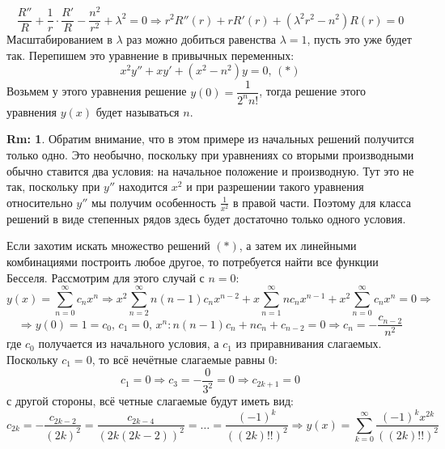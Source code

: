 \documentclass[12pt]{article}
\theoremstyle{definition}
\newtheorem{rem}{Rm:}
\newcommand{\ddsum}[2]{\displaystyle\sum\limits_{#1}^{#2}}
\begin{document}
$$
	\dfrac{R''}{R} + \dfrac{1}{r}{\cdot}\dfrac{R'}{R} - \dfrac{n^2}{r^2} + \lambda^2 = 0 \Rightarrow r^2 R''(r) + r R'(r) + (\lambda^2 r^2  - n^2)R(r) = 0
$$
Масштабированием в $\lambda$ раз можно добиться равенства $\lambda = 1$, пусть это уже будет так. Перепишем это уравнение в привычных переменных:
$$
	x^2 y'' + x y' + (x^2 - n^2)y = 0, \, (*)
$$
Возьмем у этого уравнения решение $y(0) = \dfrac{1}{2^n n!}$, тогда решение этого уравнения $y(x)$ будет называться  $n$.
\begin{rem}
	Обратим внимание, что в этом примере из начальных решений получится только одно. Это необычно, поскольку при уравнениях со вторыми производными обычно ставится два условия: на начальное положение и производную. Тут это не так, поскольку при $y''$ находится $x^2$ и при разрешении такого уравнения относительно $y''$ мы получим особенность $\tfrac{1}{x^2}$ в правой части. Поэтому для класса решений в виде степенных рядов здесь будет достаточно только одного условия. 
\end{rem}

Если захотим искать множество решений $(*)$, а затем их линейными комбинациями построить любое другое, то потребуется найти все функции Бесселя. Рассмотрим для этого случай с $n = 0$:
$$
	y(x) = \ddsum{n = 0}{\infty}c_n x^n \Rightarrow x^2 \ddsum{n = 2}{\infty}n(n-1)c_n x^{n-2} + x \ddsum{n = 1}{\infty} n c_nx^{n-1} + x^2 \ddsum{n = 0}{\infty}c_n x^n = 0 \Rightarrow
$$
$$
	\Rightarrow y(0) = 1 = c_0, \, c_1 =  0, \, x^n \colon n(n-1)c_n + n c_n + c_{n-2} = 0 \Rightarrow c_n = -\dfrac{c_{n - 2}}{n^2} 
$$
где $c_0$ получается из начального условия, а $c_1$ из приравнивания слагаемых. Поскольку $c_1 = 0$, то всё нечётные слагаемые равны $0$:
$$
	c_1 = 0 \Rightarrow c_3 = -\dfrac{0}{3^2} = 0 \Rightarrow c_{2k+1} = 0
$$
с другой стороны, всё четные слагаемые будут иметь вид:
$$
	c_{2k} = - \dfrac{c_{2k - 2}}{(2k)^2} = \dfrac{c_{2k -4}}{(2k(2k-2))^2} = \dotsc = \dfrac{(-1)^k}{((2k)!!)^2} \Rightarrow y(x) = \ddsum{k = 0}{\infty}\dfrac{(-1)^k x^{2k}}{((2k)!!)^2}
$$

\newpage
\end{document}
